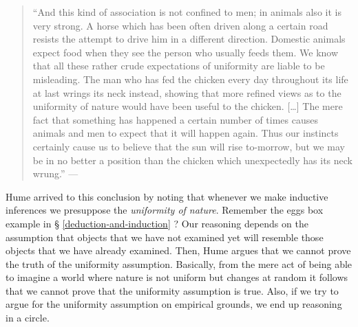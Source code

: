 \documentclass[
]{book}
\begin{document}
\begin{quote}
``And this kind of association is not confined to men; in animals also it is very strong. A horse which has been often driven along a certain road resists the attempt to drive him in a different direction. Domestic animals expect food when they see the person who usually feeds them. We know that all these rather crude expectations of uniformity are liable to be misleading. The man who has fed the chicken every day throughout its life at last wrings its neck instead, showing that more refined views as to the uniformity of nature would have been useful to the chicken. {[}\ldots{]} The mere fact that something has happened a certain number of times causes animals and men to expect that it will happen again. Thus our instincts certainly cause us to believe that the sun will rise to-morrow, but we may be in no better a position than the chicken which unexpectedly has its neck wrung.'' --- \citep{russell2001problems}
\end{quote}

Hume arrived to this conclusion by noting that whenever we make inductive inferences we presuppose the \emph{uniformity of nature}. Remember the eggs box example in § \ref{deduction-and-induction} ? Our reasoning depends on the assumption that objects that we have not examined yet will resemble those objects that we have already examined. Then, Hume argues that we cannot prove the truth of the uniformity assumption. Basically, from the mere act of being able to imagine a world where nature is not uniform but changes at random it follows that we cannot prove that the uniformity assumption is true. Also, if we try to argue for the uniformity assumption on empirical grounds, we end up reasoning in a circle.
\end{document}

